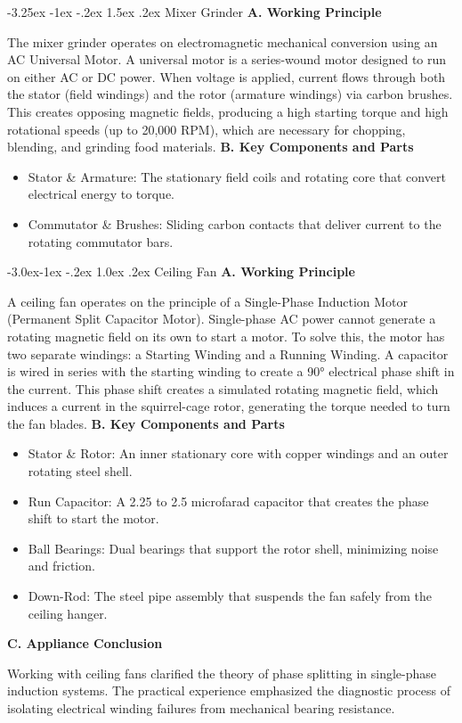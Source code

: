 \documentclass[11pt,a4paper]{report}
\makeatletter
\renewcommand{\section}{\@startsection{section}{1}{\z@}%
  {-3.25ex \@plus -1ex \@minus -.2ex}%
  {1.5ex \@plus.2ex}%
  {\normalfont\Large\bfseries\color{primaryColor}}}
\renewcommand{\subsection}{\@startsection{subsection}{2}{\z@}%
  {-3.0ex\@plus -1ex \@minus -.2ex}%
  {1.0ex \@plus .2ex}%
  {\normalfont\large\bfseries\color{secondaryColor}}}
\makeatother
\begin{document}
\section{Mixer Grinder}
\noindent\textbf{A. Working Principle}\par\medskip
The mixer grinder operates on electromagnetic mechanical conversion using an AC Universal Motor. A universal motor is a series-wound motor designed to run on either AC or DC power. When voltage is applied, current flows through both the stator (field windings) and the rotor (armature windings) via carbon brushes. This creates opposing magnetic fields, producing a high starting torque and high rotational speeds (up to 20,000 RPM), which are necessary for chopping, blending, and grinding food materials.
\noindent\textbf{B. Key Components and Parts}\par\medskip
\begin{itemize}
  \item Stator \& Armature: The stationary field coils and rotating core that convert electrical energy to torque.
  \item Commutator \& Brushes: Sliding carbon contacts that deliver current to the rotating commutator bars.
\end{itemize}
\subsection{Ceiling Fan}
\noindent\textbf{A. Working Principle}\par\medskip
A ceiling fan operates on the principle of a Single-Phase Induction Motor (Permanent Split Capacitor Motor). Single-phase AC power cannot generate a rotating magnetic field on its own to start a motor. To solve this, the motor has two separate windings: a Starting Winding and a Running Winding. A capacitor is wired in series with the starting winding to create a 90° electrical phase shift in the current. This phase shift creates a simulated rotating magnetic field, which induces a current in the squirrel-cage rotor, generating the torque needed to turn the fan blades.
\noindent\textbf{B. Key Components and Parts}\par\medskip
\begin{itemize}
  \item Stator \& Rotor: An inner stationary core with copper windings and an outer rotating steel shell.
  \item Run Capacitor: A 2.25 to 2.5 microfarad capacitor that creates the phase shift to start the motor.
  \item Ball Bearings: Dual bearings that support the rotor shell, minimizing noise and friction.
  \item Down-Rod: The steel pipe assembly that suspends the fan safely from the ceiling hanger.
\end{itemize}
\noindent\textbf{C. Appliance Conclusion}\par\medskip
Working with ceiling fans clarified the theory of phase splitting in single-phase induction systems. The practical experience emphasized the diagnostic process of isolating electrical winding failures from mechanical bearing resistance.
\end{document}
